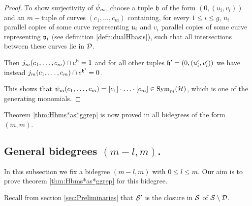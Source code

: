 \begin{proof}
To show surjectivity of $\tpsi_m$, choose a tuple $\tup$ of the form $(0,(u_i,v_i))$
and an $m-$tuple of curves $(c_1,\dots,c_m)$ containing, for every $1\leq i\leq g$, $u_i$ parallel
copies of some curve representing $\u_i$ and $v_i$ parallel copies of some curve representing
$\v_i$ (see definition \ref{defn:dualHbasis}), such that all intersections between these curves
lie in $\D$.

Then $j_m(c_1,\dots,c_m)\cap e^{\tup}=1$ and for all
other tuples $\tup'=(0,(u'_i,v'_i))$ we have instead $j_m(c_1,\dots,c_m)\cap e^{\tup'}=0$.

This shows that $\psi_m(c_1,\dots,c_m)=[c_1]\cdot\ldots\cdot[c_m]\in\Sym_m(\H)$, which is
one of the generating monomials.
\end{proof}

Theorem \ref{thm:Hbms*as*ggrep} is now proved in all bidegrees of the form $(m,m)$.

\subsection{General bidegrees $(m-l,m)$.} In this subsection we fix a bidegree $(m-l,m)$
with $0\leq l\leq m$.
Our aim is to prove theorem \ref{thm:Hbms*as*ggrep} for this bidegree.


%  
%  
% 
Recall from section \ref{sec:Preliminaries} that $\S'$ is the closure in $\S$ of
$\S\setminus\bar\D$.%

